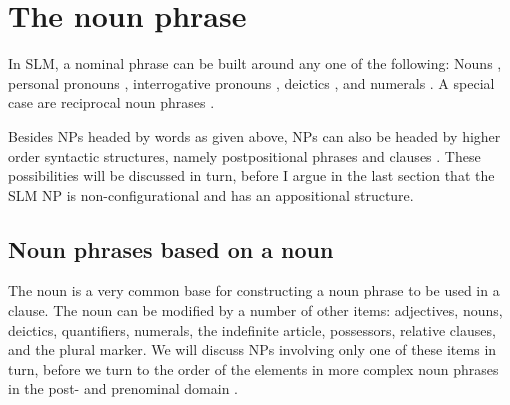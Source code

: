 \chapter{The noun phrase}\label{sec:form:ConstructionsNP}
In SLM, a nominal phrase  can be built around any one of the following:
Nouns ,
personal pronouns ,
interrogative pronouns ,
deictics , and
numerals .
A special case are reciprocal noun phrases .

Besides NPs headed by words as given above, NPs can also be headed by higher order syntactic structures, namely
postpositional phrases  and
clauses .
These possibilities will be discussed in turn, before I argue in the last section  that the SLM NP is non-configurational and has an appositional structure.

\section{Noun phrases based on a noun}\label{sec:nppp:Nounphrasesbasedonanoun}
The noun is a very common base for constructing a noun phrase to be used in a clause. The noun can be modified by a number of other items:
adjectives,
nouns,
deictics,
quantifiers,
numerals,
the indefinite article,
possessors,
relative clauses,
and the plural marker.
We will discuss NPs involving only one of these items in turn, before we turn to the order of the elements in more complex noun phrases in the post-  and prenominal domain . 

